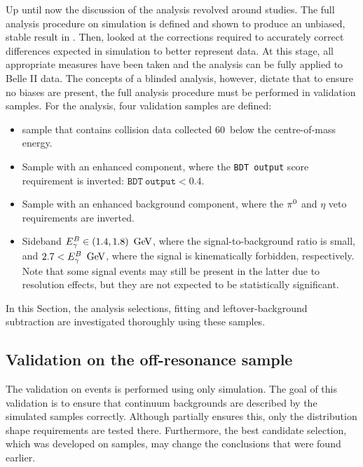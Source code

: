 Up until now the discussion of the analysis revolved around \MC studies.
The full analysis procedure on simulation is defined and shown to produce an unbiased, stable result in .
Then,  looked at the corrections required to accurately correct differences expected in simulation to better represent data.
At this stage, all appropriate measures have been taken and the analysis can be fully applied to Belle II data.
The concepts of a blinded analysis, however, dictate that to ensure no biases are present, the full analysis procedure must be performed in validation samples.
For the \BtoXsgamma analysis, four validation samples are defined:
\begin{itemize}
    \item \epem\ra\qqbar sample that contains collision data collected 60~\mev below the \FourS centre-of-mass energy.
    \item Sample with an enhanced \epem\ra\qqbar component, where the \texttt{BDT~output} score requirement is inverted: $\mathtt{BDT~output}<0.4$.
    \item Sample with an enhanced \BB background component, where the $\pi^0$ and $\eta$ veto requirements are inverted.
    \item Sideband ${E^B_{\gamma}}\in(1.4,1.8)~\mathrm{\,Ge\kern -0.1em V}$, where the signal-to-background ratio is small, and \mbox{$2.7<{E^B_{\gamma}}~\mathrm{\,Ge\kern -0.1em V}$}, where the signal is kinematically forbidden, respectively.
    Note that some signal events may still be present in the latter due to resolution effects, but they are not expected to be statistically significant.
\end{itemize}
In this Section, the analysis selections, \Mbc fitting and leftover-\BB background subtraction are investigated thoroughly using these samples.

\subsection{Validation on the \texorpdfstring{\epem\ra\qqbar}{e+e- -> qqbar} off-resonance sample}\label{sec:continuum_spectrum_validation}

The validation on \epem\ra\qqbar events is performed using only \epem\ra\qqbar simulation.
The goal of this validation is to ensure that continuum backgrounds are described by the simulated samples correctly.
Although  partially ensures this, only the distribution shape requirements are tested there.
Furthermore, the best candidate selection, which was developed on \BB samples, may change the conclusions that were found earlier.

